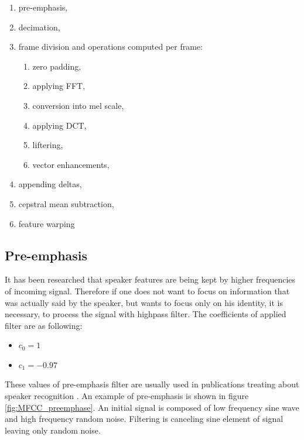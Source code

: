 \documentclass[magister]{dyplom}
\begin{document}
	\begin{enumerate}
		\item pre-emphasis,
		\item decimation,
		\item frame division and operations computed per frame:
		\begin{enumerate}
			\item zero padding,
			\item applying \gls{FFT},
			\item conversion into mel scale,
			\item applying \gls{DCT},
			\item liftering,
			\item vector enhancements,		
		\end{enumerate}		
		\item appending deltas,
		\item cepstral mean subtraction,
		\item feature warping
	\end{enumerate}
	
	\subsection{Pre-emphasis}
	
	It has been researched that speaker features are being kept by higher frequencies of incoming signal. Therefore if one does not want to focus on information that was actually said by the speaker, but wants to focus only on his identity, it is necessary, to process the signal with highpass filter. The coefficients of applied filter are as following:
	
	\begin{itemize}
		\item $c_0 = 1$
		\item $c_1 = -0.97$
	\end{itemize}
	
	These values of pre-emphasis filter are usually used in publications treating about speaker recognition \cite{SpeakerIdentificationPresentation}. An example of pre-emphasis is shown in figure \ref{fig:MFCC_preemphase}. An initial signal is composed of low frequency sine wave and high frequency random noise. Filtering is canceling sine element of signal leaving only random noise.
	
\end{document}
